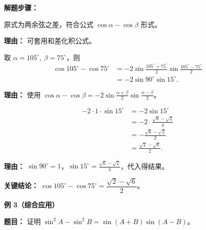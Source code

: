 \begin{examplebox}
	\textbf{\textcolor{CExample}{解题步骤：}}
	\begin{description}[style=nextline, leftmargin=2.8em, labelsep=0.5em, itemsep=0.45em]
		\item[\textbf{第一步（识别结构）：}] 原式为两余弦之差，符合公式 $\cos\alpha-\cos\beta$ 形式。
			\par\textbf{理由：} 可套用和差化积公式。
		\item[\textbf{第二步（代入公式）：}] 取 $\alpha=105^\circ,\ \beta=75^\circ$，则
			\[
				\begin{aligned}
					\cos105^\circ-\cos75^\circ &= -2\sin\frac{105^\circ+75^\circ}{2}\sin\frac{105^\circ-75^\circ}{2} \\
					&= -2\sin90^\circ\sin15^\circ.
			\end{aligned}
			\]
			\par\textbf{理由：} 使用 $\cos\alpha-\cos\beta = -2\sin\frac{\alpha+\beta}{2}\sin\frac{\alpha-\beta}{2}$。
		\item[\textbf{第三步（化简求值）：}]
			\[
				\begin{aligned}
					-2\cdot1\cdot\sin15^\circ &= -2\sin15^\circ \\
					&= -2\cdot\frac{\sqrt{6}-\sqrt{2}}{4} \\
					&= -\frac{\sqrt{6}-\sqrt{2}}{2} \\
					&= \frac{\sqrt{2}-\sqrt{6}}{2}.
			\end{aligned}
			\]
			\par\textbf{理由：} $\sin90^\circ=1$，$\sin15^\circ=\frac{\sqrt{6}-\sqrt{2}}{4}$，代入得结果。
	\end{description}

	\textbf{\textcolor{CExample}{关键结论：}}
	$\cos105^\circ-\cos75^\circ = \dfrac{\sqrt{2}-\sqrt{6}}{2}$。

	\medskip
	\textbf{\textcolor{CExample}{例 3（综合应用）}}

	\textbf{\textcolor{CExample}{题目：}}
	证明 $\sin^2 A - \sin^2 B = \sin(A+B)\sin(A-B)$。


\end{examplebox}
